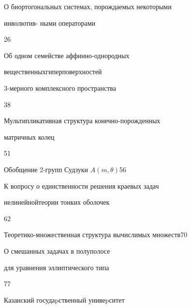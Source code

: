 {О биортогональных системах, порождаемых некоторыми  


инволютив- \newline ными операторами}{26}




{Об одном семействе аффинно-однородных


вещественных\newline гиперповерхностей


3-мерного комплексного пространства}{38}




{Мультипликативная структура конечно-порожденных


матричных колец}{51}




{Обобщение 2-групп Судзуки $A(m,\theta)$}{56}




{К вопросу о единственности решения краевых задач  


нелинейной\newline теории тонких оболочек}{62}




{Теоретико-множественная структура вычислимых множеств}{70}




{О смешанных задачах в полуполосе


для уравнения эллиптического типа}{77}


































\vfill


\noindent\raisebox{2pt}{\copyright} Казанский госудаpственный унивеpситет






